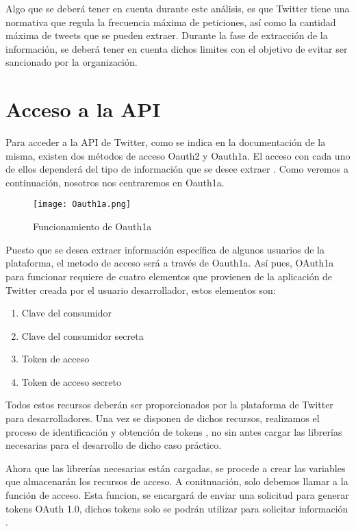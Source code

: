 Algo que se deberá tener en cuenta durante este análisis, es que Twitter tiene una normativa que regula 
la frecuencia máxima de peticiones, así como la cantidad máxima de tweets que se pueden extraer. Durante 
la fase de extracción de la información, se deberá tener en cuenta dichos limites con el objetivo de 
evitar ser sancionado por la organización.

\section{Acceso a la API}
\label{sec:acceso-api}

Para acceder a la API de Twitter, como se indica en la documentación de la misma, existen dos métodos de 
acceso Oauth2 y Oauth1a. El acceso con cada uno de ellos dependerá del tipo de información que se desee 
extraer \cite{oauth1a}. Como veremos a continuación, nosotros nos centraremos en Oauth1a.

\begin{figure}[tphb]
  		   \centering
     		   \texttt{[image: Oauth1a.png]}
  		   \caption{Funcionamiento de Oauth1a}
  		   \label{img:oauth1a}
\end{figure}

Puesto que se desea extraer información específica de algunos usuarios de la plataforma, el metodo de 
acceso será a través de Oauth1a. Así pues, OAuth1a para funcionar requiere 
de cuatro elementos que provienen de la aplicación de Twitter creada por el usuario desarrollador, estos elementos son:

\begin{enumerate}
	\item Clave del consumidor
	\item Clave del consumidor secreta
	\item Token de acceso
	\item Token de acceso secreto
\end{enumerate}


Todos estos recursos deberán ser proporcionados por la plataforma de Twitter para desarrolladores. Una 
vez se disponen de dichos recursos, realizamos el proceso de identificación y obtención de tokens \cite{error_oauth1a}, 
no sin antes cargar las librerías necesarias para el desarrollo de dicho caso práctico.



Ahora que las librerías necesarias están cargadas, se procede a crear las variables que almacenarán los 
recursos de acceso. A conitnuación, solo debemos llamar a la función de acceso. Esta funcion, se encargará de enviar 
una solicitud para generar tokens OAuth 1.0, dichos tokens solo se podrán utilizar para solicitar información \cite{create_token}.

